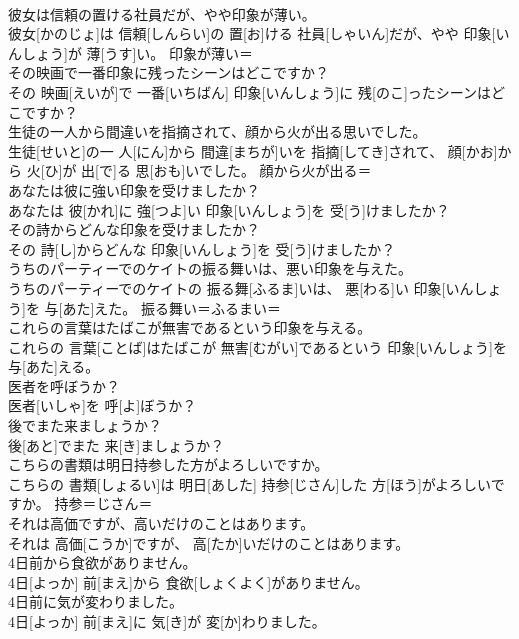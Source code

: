 \documentclass[8pt]{extreport}
\begin{document}
\begin{CJK}{UTF8}{min}
\\	彼女は信頼の置ける社員だが、やや印象が薄い。	
\\	彼女[かのじょ]は 信頼[しんらい]の 置[お]ける 社員[しゃいん]だが、やや 印象[いんしょう]が 薄[うす]い。	印象が薄い＝ 
\\	その映画で一番印象に残ったシーンはどこですか？	
\\	その 映画[えいが]で 一番[いちばん] 印象[いんしょう]に 残[のこ]ったシーンはどこですか？	
\\	生徒の一人から間違いを指摘されて、顔から火が出る思いでした。	
\\	生徒[せいと]の一 人[にん]から 間違[まちが]いを 指摘[してき]されて、 顔[かお]から 火[ひ]が 出[で]る 思[おも]いでした。	顔から火が出る＝ 
\\	あなたは彼に強い印象を受けましたか？	
\\	あなたは 彼[かれ]に 強[つよ]い 印象[いんしょう]を 受[う]けましたか？	
\\	その詩からどんな印象を受けましたか？	
\\	その 詩[し]からどんな 印象[いんしょう]を 受[う]けましたか？	
\\	うちのパーティーでのケイトの振る舞いは、悪い印象を与えた。	
\\	うちのパーティーでのケイトの 振る舞[ふるま]いは、 悪[わる]い 印象[いんしょう]を 与[あた]えた。	振る舞い＝ふるまい＝ 
\\	これらの言葉はたばこが無害であるという印象を与える。	
\\	これらの 言葉[ことば]はたばこが 無害[むがい]であるという 印象[いんしょう]を 与[あた]える。	
\\	医者を呼ぼうか？	
\\	医者[いしゃ]を 呼[よ]ぼうか？	
\\	後でまた来ましょうか？	
\\	後[あと]でまた 来[き]ましょうか？	
\\	こちらの書類は明日持参した方がよろしいですか。	
\\	こちらの 書類[しょるい]は 明日[あした] 持参[じさん]した 方[ほう]がよろしいですか。	持参＝じさん＝ 
\\	それは高価ですが、高いだけのことはあります。	
\\	それは 高価[こうか]ですが、 高[たか]いだけのことはあります。	
\\	4日前から食欲がありません。	
\\	4日[よっか] 前[まえ]から 食欲[しょくよく]がありません。	
\\	4日前に気が変わりました。	
\\	4日[よっか] 前[まえ]に 気[き]が 変[か]わりました。	

\end{CJK}
\end{document}

